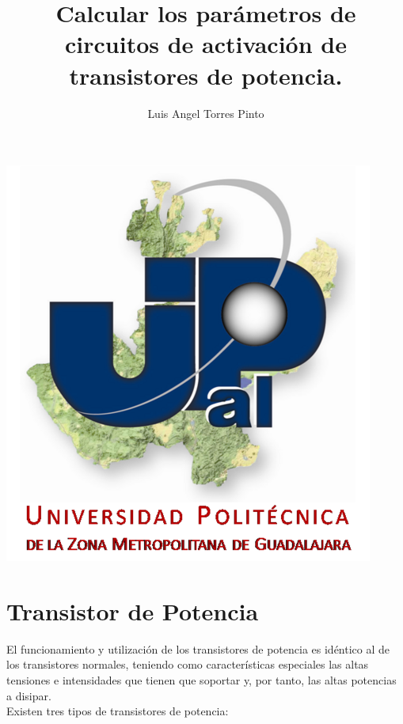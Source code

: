 \documentclass[10pt,a4paper]{article}
\author{Luis Angel Torres Pinto}
\title{Calcular los parámetros de circuitos de activación de transistores de potencia.}\\
\begin{document}
\maketitle
\centering
\includegraphics[scale=2]{upzmg.jpg}\\
\raggedright
\newpage 
\section{Transistor de Potencia }
El funcionamiento y utilización de los transistores de potencia es idéntico al de los transistores normales, teniendo como características especiales las altas tensiones e intensidades que tienen que soportar y, por tanto, las altas potencias a disipar.\\
\bigskip 
Existen tres tipos de transistores de potencia:\\
\end{document}
